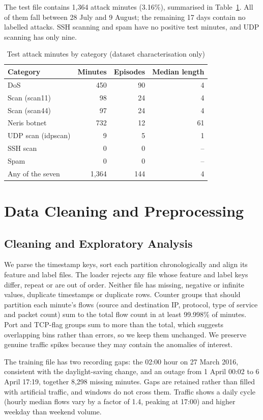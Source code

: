 \documentclass[conference]{IEEEtran}
\begin{document}
The test file contains 1,364 attack minutes (3.16\%), summarised in Table~\ref{tab:categories}. All of them fall between 28 July and 9 August; the remaining 17 days contain no labelled attacks. SSH scanning and spam have no positive test minutes, and UDP scanning has only nine.

\begin{table}[t]
\caption{Test attack minutes by category (dataset characterisation only)}
\label{tab:categories}
\centering
\begin{tabular}{lrrr}
\toprule
Category & Minutes & Episodes & Median length \\
\midrule
DoS & 450 & 90 & 4 \\
Scan (scan11) & 98 & 24 & 4 \\
Scan (scan44) & 97 & 24 & 4 \\
Neris botnet & 732 & 12 & 61 \\
UDP scan (idpscan) & 9 & 5 & 1 \\
SSH scan & 0 & 0 & -- \\
Spam & 0 & 0 & -- \\
\midrule
Any of the seven & 1,364 & 144 & 4 \\
\bottomrule
\end{tabular}
\end{table}

\section{Data Cleaning and Preprocessing}
\subsection{Cleaning and Exploratory Analysis}
We parse the timestamp keys, sort each partition chronologically and align its feature and label files. The loader rejects any file whose feature and label keys differ, repeat or are out of order. Neither file has missing, negative or infinite values, duplicate timestamps or duplicate rows. Counter groups that should partition each minute's flows (source and destination IP, protocol, type of service and packet count) sum to the total flow count in at least 99.998\% of minutes. Port and TCP-flag groups sum to more than the total, which suggests overlapping bins rather than errors, so we keep them unchanged. We preserve genuine traffic spikes because they may contain the anomalies of interest.

The training file has two recording gaps: the 02:00 hour on 27 March 2016, consistent with the daylight-saving change, and an outage from 1 April 00:02 to 6 April 17:19, together 8,298 missing minutes. Gaps are retained rather than filled with artificial traffic, and windows do not cross them. Traffic shows a daily cycle (hourly median flows vary by a factor of 1.4, peaking at 17:00) and higher weekday than weekend volume.
\end{document}
